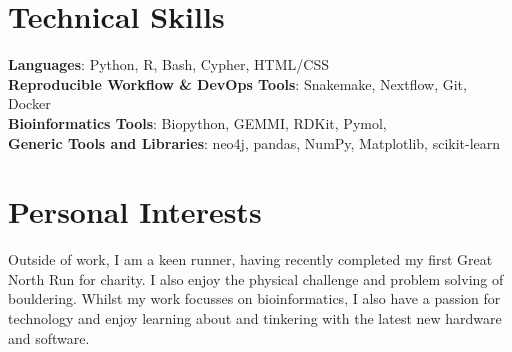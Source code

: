 \documentclass[a4paper,11pt]{article}
\begin{document}
\section{Technical Skills}
 \begin{itemize}[leftmargin=0.15in, label={}]
    \small{\item{
     \textbf{Languages}{: Python, R, Bash, Cypher, HTML/CSS} \\
     \textbf{Reproducible Workflow \& DevOps Tools}{: Snakemake, Nextflow, Git, Docker} \\
     \textbf{Bioinformatics Tools}{: Biopython, GEMMI, RDKit, Pymol, } \\
     \textbf{Generic Tools and Libraries}{: neo4j, pandas, NumPy, Matplotlib, scikit-learn}
     
    }}
 \end{itemize}


%
\section{Personal Interests}
\begin{flushleft}
Outside of work, I am a keen runner, having recently completed my first Great North Run for charity. I also enjoy the physical challenge and problem solving of bouldering. Whilst my work focusses on bioinformatics, I also have a passion for technology and enjoy learning about and tinkering with the latest new hardware and software.
\end{flushleft}

\end{document}
